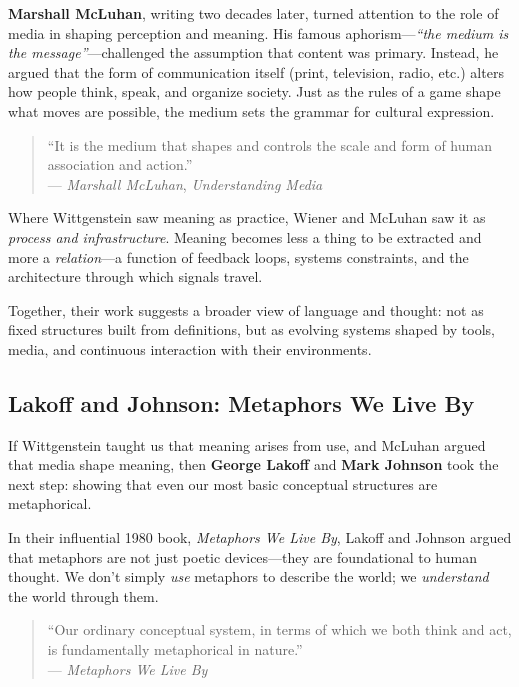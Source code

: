 \medskip

\textbf{Marshall McLuhan}, writing two decades later, turned attention to the role of media in shaping perception and meaning. His famous aphorism—\textit{``the medium is the message''}—challenged the assumption that content was primary. Instead, he argued that the form of communication itself (print, television, radio, etc.) alters how people think, speak, and organize society. Just as the rules of a game shape what moves are possible, the medium sets the grammar for cultural expression.

\begin{quote}
``It is the medium that shapes and controls the scale and form of human association and action.''\\
— \textit{Marshall McLuhan}, \textit{Understanding Media}
\end{quote}

\noindent
Where Wittgenstein saw meaning as practice, Wiener and McLuhan saw it as \emph{process and infrastructure}. Meaning becomes less a thing to be extracted and more a \emph{relation}—a function of feedback loops, systems constraints, and the architecture through which signals travel.

\medskip

\noindent
Together, their work suggests a broader view of language and thought: not as fixed structures built from definitions, but as evolving systems shaped by tools, media, and continuous interaction with their environments.

\subsection{Lakoff and Johnson: Metaphors We Live By}

If Wittgenstein taught us that meaning arises from use, and McLuhan argued that media shape meaning, then \textbf{George Lakoff} and \textbf{Mark Johnson} took the next step: showing that even our most basic conceptual structures are metaphorical.

In their influential 1980 book, \textit{Metaphors We Live By}, Lakoff and Johnson argued that metaphors are not just poetic devices—they are foundational to human thought. We don't simply \emph{use} metaphors to describe the world; we \emph{understand} the world through them.

\begin{quote}
    ``Our ordinary conceptual system, in terms of which we both think and act, is fundamentally metaphorical in nature.''\\
    — \textit{Metaphors We Live By}
\end{quote}

